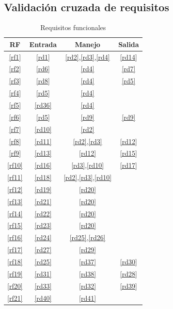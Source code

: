 \documentclass[12pt,a4paper]{article}
\begin{document}
\subsection{Validación cruzada de requisitos}
\begin{table}[H]
\begin{center}
\begin{tabular}{|c|c|c|c|}
\hline
	RF & Entrada & Manejo & Salida\\
\hline
	\ref{rf1} & \ref{rd1} & \ref{rd2},\ref{rd3},\ref{rd4} & \ref{rd14}\\
\hline
	\ref{rf2} & \ref{rd6} & \ref{rd4} & \ref{rd7}\\
\hline
	\ref{rf3} & \ref{rd8} & \ref{rd4} & \ref{rd5}\\
\hline
	\ref{rf4} & \ref{rd5} & \ref{rd4} & \\
\hline
	\ref{rf5} & \ref{rd36} & \ref{rd4} & \\
\hline
	\ref{rf6} & \ref{rd5} & \ref{rd9} & \ref{rd9}\\
\hline
	\ref{rf7} & \ref{rd10} & \ref{rd2} & \\
\hline
	\ref{rf8} & \ref{rd11} & \ref{rd2},\ref{rd3} & \ref{rd12}\\
\hline
	\ref{rf9} & \ref{rd13} & \ref{rd12} & \ref{rd15}\\
\hline
	\ref{rf10} & \ref{rd16} & \ref{rd3},\ref{rd10} & \ref{rd17}\\
\hline
	\ref{rf11} & \ref{rd18} & \ref{rd2},\ref{rd3},\ref{rd10} & \\
\hline
	\ref{rf12} & \ref{rd19} & \ref{rd20} & \\
\hline
	\ref{rf13} & \ref{rd21} & \ref{rd20} & \\
\hline
	\ref{rf14} & \ref{rd22} & \ref{rd20} & \\
\hline
	\ref{rf15} & \ref{rd23} & \ref{rd20} & \\
\hline
	\ref{rf16} & \ref{rd24} & \ref{rd25},\ref{rd26} & \\
\hline
	\ref{rf17} & \ref{rd27} & \ref{rd29} & \\
\hline
	\ref{rf18} & \ref{rd25} & \ref{rd37} & \ref{rd30}\\
\hline
	\ref{rf19} & \ref{rd31} & \ref{rd38} & \ref{rd28}\\
\hline
	\ref{rf20} & \ref{rd33} & \ref{rd32} & \ref{rd39}\\
\hline
	\ref{rf21} & \ref{rd40} & \ref{rd41} & \\
\hline
\end{tabular}
\end{center}
\caption{Requisitos funcionales}
\end{table}
\end{document}
